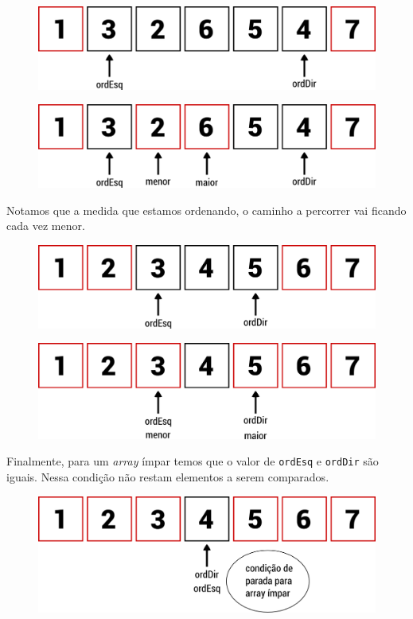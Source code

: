 \begin{figure}[h]
   \includegraphics[scale=0.6]{img/maior.menor.algoritmo/passo3.png}
\end{figure}

\newpage

\begin{figure}[h]
   \includegraphics[scale=0.6]{img/maior.menor.algoritmo/passo4.png}
\end{figure}

Notamos que a medida que estamos ordenando, o caminho a percorrer vai
ficando cada vez menor.

\begin{figure}[h]
   \includegraphics[scale=0.6]{img/maior.menor.algoritmo/passo5.png}
\end{figure}

\begin{figure}[h]
   \includegraphics[scale=0.6]{img/maior.menor.algoritmo/passo6.png}
\end{figure}

Finalmente, para um \emph{array} ímpar temos que o valor de
\texttt{ordEsq} e \texttt{ordDir} são iguais. Nessa condição não restam
elementos a serem comparados.

\begin{figure}[h]
   \includegraphics[scale=0.6]{img/maior.menor.algoritmo/passo7.png}
\end{figure}
